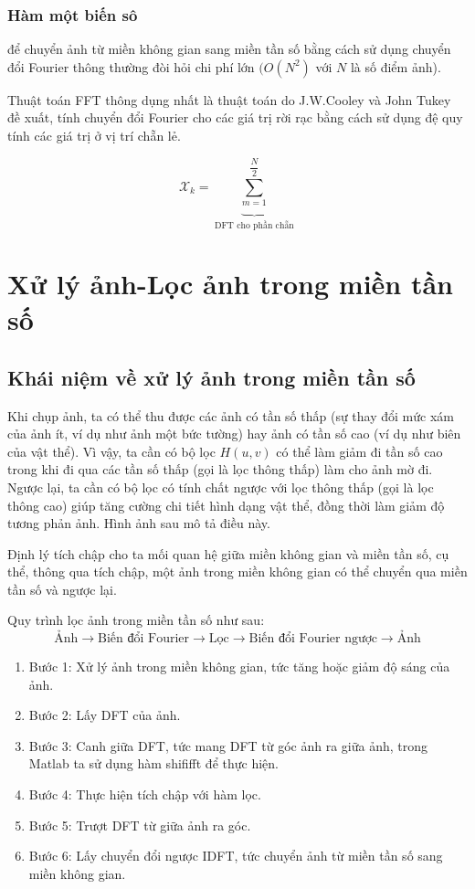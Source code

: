 \documentclass[12pt,a4paper]{report}
\numberwithin{equation}{section}
\theoremstyle{definition} %
\begin{document}
\subsubsection{Hàm một biến sô}
để chuyển ảnh từ miền không gian sang miền tần số bằng cách sử dụng chuyển đổi Fourier thông thường đòi hỏi chi phí lớn $(O(N^2)$ với $N$ là số điểm ảnh).

Thuật toán FFT thông dụng nhất là thuật toán do J.W.Cooley và John Tukey đề xuất, tính chuyển đổi Fourier cho các giá trị rời rạc bằng cách sử dụng đệ quy tính các giá trị ở vị trí chẵn lẻ. 


\begin{equation}
\mathcal{X}_k = \underbrace{\sum_{m=1}^{\dfrac{N}{2}}}_{ \text{DFT cho phần chẵn}}
\end{equation}
\section{Xử lý ảnh-Lọc ảnh trong miền tần số}
\subsection{Khái niệm về xử lý ảnh trong miền tần số}
Khi chụp ảnh, ta có thể thu được các ảnh có tần số thấp (sự thay đổi mức xám của ảnh ít, ví dụ như ảnh một bức tường) hay ảnh có tần số cao (ví dụ như biên của vật thể). Vì vậy, ta cần có bộ lọc $H(u,v)$ có thể làm giảm đi tần số cao trong khi đi qua các tần số thấp (gọi là lọc thông thấp) làm cho ảnh mờ đi. Ngược lại, ta cần có bộ lọc có tính chất ngược với lọc thông thấp (gọi là lọc thông cao) giúp tăng cường chi tiết hình dạng vật thể, đồng thời làm giảm độ tương phản ảnh. Hình ảnh sau mô tả điều này.

Định lý tích chập cho ta mối quan hệ giữa miền không gian và miền tần số, cụ thể, thông qua tích chập, một ảnh trong miền không gian có thể chuyển qua miền tần số và ngược lại.

Quy trình lọc ảnh trong miền tần số như sau:
\[\text{Ảnh}\rightarrow\text{Biến đổi Fourier}\rightarrow\text{Lọc}\rightarrow\text{Biến đổi Fourier ngược}
\rightarrow\text{Ảnh}\]
\begin{enumerate}
\item Bước 1: Xử lý ảnh trong miền không gian, tức tăng hoặc giảm độ sáng của ảnh.
\item Bước 2: Lấy DFT của ảnh.
\item Bước 3: Canh giữa DFT, tức mang DFT từ góc ảnh ra giữa ảnh, trong Matlab ta sử dụng hàm shififft để thực hiện.
\item Bước 4: Thực hiện tích chập với hàm lọc.
\item Bước 5: Trượt DFT từ giữa ảnh ra góc.
\item Bước 6: Lấy chuyển đổi ngược IDFT, tức chuyển ảnh từ miền tần số sang miền không gian.
\end{enumerate}
\end{document}
